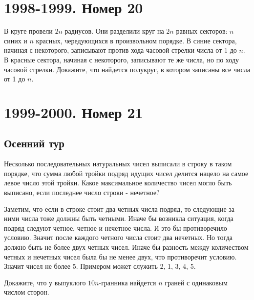 \documentclass[11pt, a4paper]{common/document_template}
\begin{document}
\chapter{1998-1999. Номер 20}

\begin{exercise}
В круге провели $2n$ радиусов. Они разделили круг на $2n$ равных секторов: $n$ синих и $n$ красных, чередующихся в произвольном порядке. В синие сектора, начиная с некоторого, записывают против хода часовой стрелки числа от 1 до $n$. В красные сектора, начиная с некоторого, записывают те же числа, но по ходу часовой стрелки. Докажите, что найдется полукруг, в котором записаны все числа от 1 до $n$.
\end{exercise}

\begin{Solution}

\end{Solution}

\chapter{1999-2000. Номер 21}

\section{Осенний тур}

\begin{exercise}
Несколько последовательных натуральных чисел выписали в строку в таком порядке, что сумма любой тройки подряд идущих чисел делится нацело на самое левое число этой тройки. Какое максимальное количество чисел могло быть выписано, если последнее число строки - нечетное?
\end{exercise}

\begin{Solution}
Заметим, что если в строке стоит два четных числа подряд, то следующие за ними числа тоже должны быть четными. Иначе бы возникла ситуация, когда подряд следуют четное, четное и нечетное числа. И это бы противоречило условию. Значит после каждого четного числа стоит два нечетных. Но тогда должно быть не более двух четных чисел. Иначе бы разность между количеством четных и нечетных чисел была бы не менее двух, что противоречит условию. Значит чисел не более 5. Примером может служить 2, 1, 3, 4, 5.
\end{Solution}

\begin{exercise}
Докажите, что у выпуклого $10n$-гранника найдется $n$ граней с одинаковым числом сторон.
\end{exercise}
\end{document}
